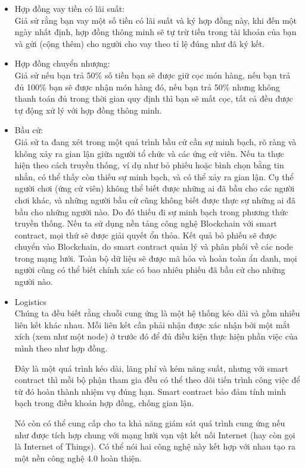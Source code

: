 \begin{itemize}
	\item {Hợp đồng vay tiền có lãi suất:}\\
	Giả sử rằng bạn vay một số tiền có lãi suất và ký hợp đồng này, khi đến một ngày nhất định, hợp đồng thông minh sẽ tự trừ tiền trong tài khoản của bạn và gửi (cộng thêm) cho người cho vay theo tỉ lệ đúng như đã ký kết.
	
	\item{Hợp đồng chuyển nhượng:}\\
	Giả sử nếu bạn trả 50\% số tiền bạn sẽ được giữ cọc món hàng, nếu bạn trả đủ 100\% bạn sẽ được nhận món hàng đó, nếu bạn trả 50\% nhưng không thanh toán đủ trong thời gian quy định thì bạn sẽ mất cọc, tất cả đều được tự động xử lý với hợp đồng thông minh.
	
	\item{Bầu cử:}\\
	Giả sử ta đang xét trong một quá trình bầu cử cần sự minh bạch, rõ ràng và không xảy ra gian lận giữa người tổ chức và các ứng cử viên. Nếu ta thực hiện theo cách truyền thống, ví dụ như bỏ phiếu hoặc bình chọn bằng tin nhắn, có thể thấy còn thiếu sự minh bạch, và có thể xảy ra gian lận. Cụ thể người chơi (ứng cử viên) không thể biết được những ai đã bầu cho các người chơi khác, và những người bầu cử cũng không biết được thực sự những ai đã bầu cho những người nào. Do đó thiếu đi sự minh bạch trong phương thức truyền thống. Nếu ta sử dụng nền tảng công nghệ Blockchain với smart contract, mọi thứ sẽ được giải quyết ổn thỏa. Kết quả bỏ phiếu sẽ được chuyển vào Blockchain, do smart contract quản lý và phân phối về các node trong mạng lưới. Toàn bộ dữ liệu sẽ được mã hóa và hoàn toàn ẩn danh, mọi người cũng có thể biết chính xác có bao nhiêu phiếu đã bầu cử cho những người nào.
	
	\item{Logistics}\\
	Chúng ta đều biết rằng chuỗi cung ứng là một hệ thống kéo dài và gồm nhiều liên kết khác nhau. Mỗi liên kết cần phải nhận được xác nhận bởi một mắt xích (xem như một node) ở trước đó để đủ điều kiện thực hiện phần việc của mình theo như hợp đồng.
	
	Đây là một quá trình kéo dài, lãng phí và kém năng suất, nhưng với smart contract thì mỗi bộ phận tham gia đều có thể theo dõi tiến trình công việc để từ đó hoàn thành nhiệm vụ đúng hạn. Smart contract bảo đảm tính minh bạch trong điều khoản hợp đồng, chống gian lận.
	
	Nó còn có thể cung cấp cho ta khả năng giám sát quá trình cung ứng nếu như được tích hợp chung với mạng lưới vạn vật kết nối Internet (hay còn gọi là Internet of Things). Có thể nói hai công nghệ này kết hợp với nhau tạo ra một nền công nghệ 4.0 hoàn thiện.
	

\end{itemize}
